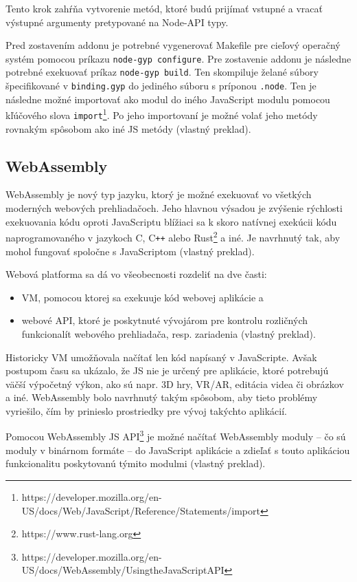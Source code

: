Tento krok zahŕňa vytvorenie metód, ktoré budú prijímať vstupné a vracať výstupné argumenty pretypované na Node-API typy.

Pred zostavením addonu je potrebné vygenerovať Makefile pre cieľový operačný systém pomocou príkazu \texttt{node-gyp configure}. Pre zostavenie addonu je následne potrebné exekuovať príkaz \texttt{node-gyp build}. Ten skompiluje želané súbory špecifikované v \texttt{binding.gyp} do jediného súboru s príponou \texttt{.node}. Ten je následne možné importovať ako modul do iného JavaScript modulu pomocou kľúčového slova \texttt{import}\footnote{https://developer.mozilla.org/en-US/docs/Web/JavaScript/Reference/Statements/import}. Po jeho importovaní je možné volať jeho metódy rovnakým spôsobom ako iné JS metódy \cite{cpp_addons} (vlastný preklad).

\subsection {WebAssembly}
WebAssembly je nový typ jazyku, ktorý je možné exekuovať vo všetkých moderných webových prehliadačoch. Jeho hlavnou výsadou je zvýšenie rýchlosti exekuovania kódu oproti JavaScriptu blížiaci sa k skoro natívnej exekúcii kódu naprogramovaného v jazykoch C, C\texttt{++} alebo Rust\footnote{https://www.rust-lang.org} a iné. Je navrhnutý tak, aby mohol fungovať spoločne s JavaScriptom \cite{webassembly_concepts} (vlastný preklad).

Webová platforma sa dá vo všeobecnosti rozdeliť na dve časti:
\begin{itemize}
\item {VM, pomocou ktorej sa exekuuje kód webovej aplikácie a}
\item {webové API, ktoré je poskytnuté vývojárom pre kontrolu rozličných funkcionalít webového prehliadača, resp. zariadenia  \cite{webassembly_concepts} (vlastný preklad).}
\end{itemize}

Historicky VM umožňovala načítať len kód napísaný v JavaScripte. Avšak postupom času sa ukázalo, že JS nie je určený pre aplikácie, ktoré potrebujú väčší výpočetný výkon, ako sú napr. 3D hry, VR/AR, editácia videa či obrázkov a iné.
WebAssembly bolo navrhnutý takým spôsobom, aby tieto problémy vyriešilo, čím by prinieslo prostriedky pre vývoj takýchto aplikácií. 

Pomocou WebAssembly JS API\footnote{https://developer.mozilla.org/en-US/docs/WebAssembly/Using\textunderscore the\textunderscore JavaScript\textunderscore API} je možné načítať WebAssembly moduly -- čo sú moduly v binárnom formáte -- do JavaScript aplikácie a zdieľať s touto aplikáciou funkcionalitu poskytovanú týmito modulmi \cite{webassembly_concepts} (vlastný preklad).

